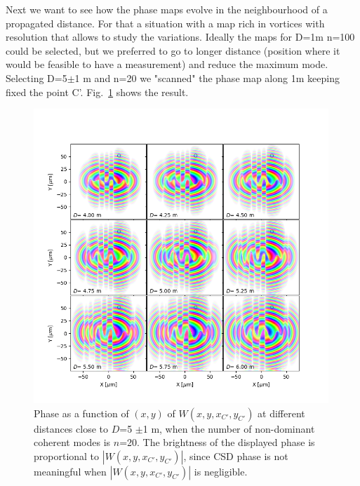 \documentclass{iucr}              %
\newcommand{\inblue}[1]{{\color{blue}#1}}
\begin{document}
Next we want to see how the phase maps evolve in the neighbourhood of a propagated distance. For that a situation with a map rich in vortices with resolution that allows to study the variations. Ideally the maps for D=1m n=100 could be selected, but we preferred to go to longer distance (position where it would be feasible to have a measurement) and reduce the maximum mode. Selecting D=5$\pm$1 m and n=20 we "scanned" the phase map along 1m keeping fixed the point C'. \inblue{Fig.~\ref{neighbour}} shows the result. 


\begin{figure}\label{neighbour}%
\caption{Phase as a function of $(x,y)$ of $W(x,y,x_{C'},y_{C'})$ at different distances close to $D$=5 $\pm$1 m, when the number of non-dominant coherent modes is $n$=20. The brightness of the displayed phase is proportional to $|W(x,y,x_{C'},y_{C'})|$, since CSD phase is not meaningful when $|W(x,y,x_{C'},y_{C'})|$ is negligible.}
\includegraphics[width=0.99\textwidth]{Figures/vx_id16a_C5_propagated_neighbour_mode0019.png}

\end{figure}
\end{document}
